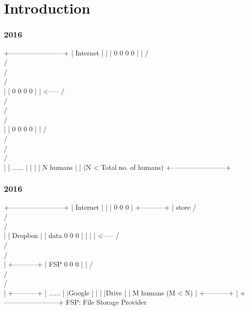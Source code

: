 
\section{Introduction}

\begin{frame}[fragile]
  \frametitle{2016}
  {\scriptsize
  \begin{semiverbatim}
   +------------------------+
   | Internet               |
   |                        |          0   0   0   0
   |                        |         / \\ / \\ / \\ / \\
   |                        |          0   0   0   0
   |                        | <-----  / \\ / \\ / \\ / \\
   |                        |          0   0   0   0
   |                        |         / \\ / \\ / \\ / \\
   |                        |              ......
   |                        |
   |                        |             N humans
   |                        |       (N < Total no. of humans)
   +------------------------+
  \end{semiverbatim}
  }
\end{frame}


\begin{frame}[fragile]
  \frametitle{2016}
  {\scriptsize
  \begin{semiverbatim}
   +------------------------+
   | Internet               |
   |                        |          0   0   0
   |  +-----------+         | store   / \\ / \\ / \\
   |  | Dropbox   |         |  data    0   0   0
   |  |           |         | <-----  / \\ / \\ / \\
   |  +-----------+         |   FSP    0   0   0
   |                        |         / \\ / \\ / \\
   |          +-----------+ |           ......
   |          |Google     | |
   |          |Drive      | |             M humans (M < N)
   |          +-----------+ |
   +------------------------+      FSP: File Storage Provider
  \end{semiverbatim}
  }
\end{frame}


